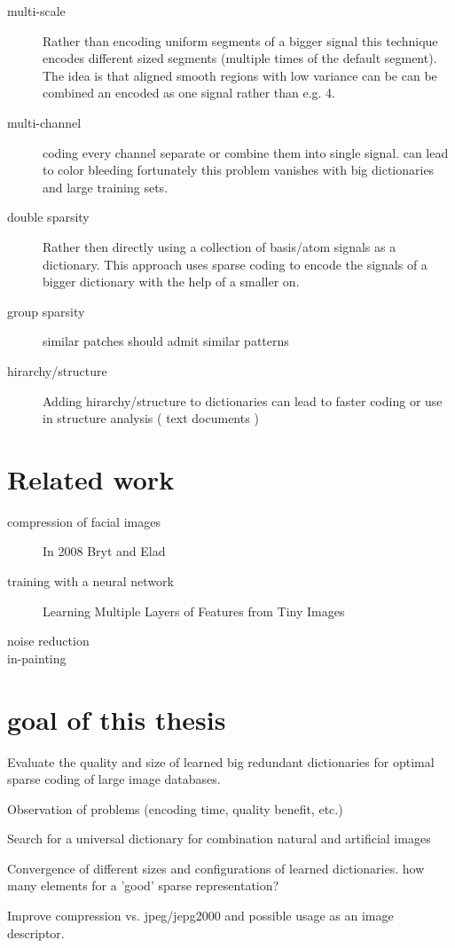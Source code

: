 \begin{description}
\item[multi-scale]
Rather than encoding uniform segments of a bigger signal this technique encodes different sized 
segments (multiple times of the default segment). The idea is that aligned smooth regions with low variance can be 
can be combined an encoded as one signal rather than e.g. 4. \cite{saprio}

\item[multi-channel]
coding every channel separate or combine them
into single signal. can lead to color bleeding \cite{mairal08sparse}
fortunately this problem vanishes with big dictionaries and large training sets. \cite{mairal08sparse}

\item[double sparsity]
Rather then directly using a collection of basis/atom signals as a dictionary. This approach uses sparse coding
to encode the signals of a bigger dictionary with the help of a smaller on. \cite{double sparsity}

\item[group sparsity]
similar patches should admit similar patterns
\cite{double sparsity}

\item[hirarchy/structure]
Adding hirarchy/structure to dictionaries can lead to faster coding or use in structure analysis ( text documents )
\cite{Jenatton2010}

\end{description}




\section{Related work}
\begin{description}
\item[compression of facial images] In 2008 Bryt and Elad \cite{Bryt2008} 
\item[training with a neural network]
Learning Multiple Layers of Features from Tiny Images \cite{Krizhevsky2009}
\item[noise reduction]
\item[in-painting]
\end{description}



\section{goal of this thesis}
Evaluate the quality and size of learned big redundant dictionaries for 
optimal sparse coding of large image databases.

Observation of problems (encoding time, quality benefit, etc.)

Search for a universal dictionary for combination natural and artificial images
 
Convergence of different sizes and configurations of learned dictionaries.
how many elements for a 'good' sparse representation?



Improve compression vs. jpeg/jepg2000 and possible usage as an image descriptor.
